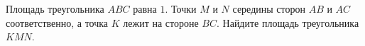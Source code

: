 \begin{ex}
	\begin{condition}
		Площадь треугольника \( ABC \) равна \( 1 \). Точки \( M \) и \( N \) середины сторон \( AB \) и \( AC \) соответственно, а точка \( K \) лежит на стороне \( BC \). Найдите площадь треугольника \( KMN \).
	\end{condition}
\end{ex}